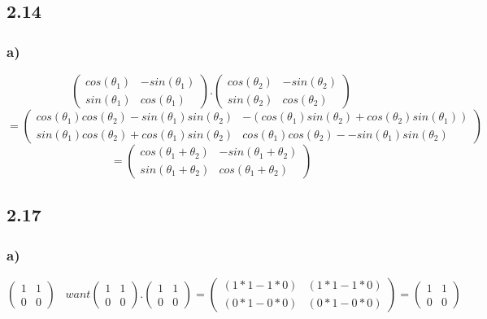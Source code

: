 \documentclass[11pt]{article}
\begin{document}
\subsection*{2.14}
\subsubsection*{a)}
\[
\begin{pmatrix}
cos(\theta_1) & -sin(\theta_1)\\
sin(\theta_1) & cos(\theta_1)
\end{pmatrix}
.
\begin{pmatrix}
cos(\theta_2) & -sin(\theta_2)\\
sin(\theta_2) & cos(\theta_2)
\end{pmatrix}
\]
\[
=
\begin{pmatrix}
cos(\theta_1)cos(\theta_2) - sin(\theta_1)sin(\theta_2) & -(cos(\theta_1)sin(\theta_2)+cos(\theta_2)sin(\theta_1))\\
sin(\theta_1)cos(\theta_2)+cos(\theta_1)sin(\theta_2) &
cos(\theta_1)cos(\theta_2) - -sin(\theta_1)sin(\theta_2)
\end{pmatrix}
\]
\[
=
\begin{pmatrix}
cos(\theta_1+\theta_2) & -sin(\theta_1+\theta_2)\\
sin(\theta_1+\theta_2) & cos(\theta_1+\theta_2)
\end{pmatrix}
\]

\subsection*{2.17}
\subsubsection*{a)}
\[
\begin{pmatrix}
1 & 1\\
0 & 0
\end{pmatrix}
\;\;\; want
\begin{pmatrix}
1 & 1\\
0 & 0
\end{pmatrix}
.
\begin{pmatrix}
1 & 1\\
0 & 0
\end{pmatrix}
=
\begin{pmatrix}
(1*1-1*0) & (1*1-1*0)\\
(0*1-0*0) & (0*1-0*0)
\end{pmatrix}
=
\begin{pmatrix}
1 & 1\\
0 & 0
\end{pmatrix}
\]
\end{document}
